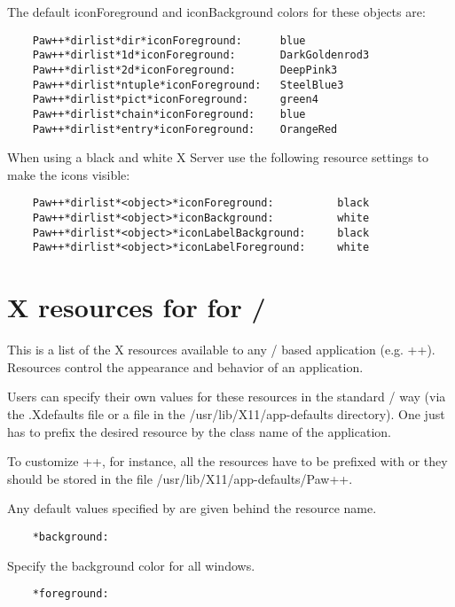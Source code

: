    The default iconForeground and iconBackground colors for these objects are:

\begin{verbatim}
    Paw++*dirlist*dir*iconForeground:      blue
    Paw++*dirlist*1d*iconForeground:       DarkGoldenrod3
    Paw++*dirlist*2d*iconForeground:       DeepPink3
    Paw++*dirlist*ntuple*iconForeground:   SteelBlue3
    Paw++*dirlist*pict*iconForeground:     green4
    Paw++*dirlist*chain*iconForeground:    blue
    Paw++*dirlist*entry*iconForeground:    OrangeRed
\end{verbatim}

   When using a black and white X Server use the following resource settings
   to make the icons visible:

\begin{verbatim}
    Paw++*dirlist*<object>*iconForeground:          black
    Paw++*dirlist*<object>*iconBackground:          white
    Paw++*dirlist*<object>*iconLabelBackground:     black
    Paw++*dirlist*<object>*iconLabelForeground:     white
\end{verbatim}

\section{X resources for for \KUIP/\MOTIF}

   This is a list of the X resources available to any \KUIP/\MOTIF{} based
   application (e.g. \PAW++).  Resources control the appearance and behavior of
   an application.

   Users can specify their own values for these resources in the standard
   /\MOTIF{} way (via the .Xdefaults file or a file in the
   /usr/lib/X11/app-defaults directory). One just has to prefix the desired
   resource by the class name of the application.

   To customize \PAW++, for instance, all the resources have to be prefixed
   with  or they should be stored in the file
   /usr/lib/X11/app-defaults/Paw++.

   Any default values specified by \KUIP{} are given behind the resource name.

\begin{verbatim}
    *background:
\end{verbatim}

   Specify the background color for all windows.

\begin{verbatim}
    *foreground:
\end{verbatim}

